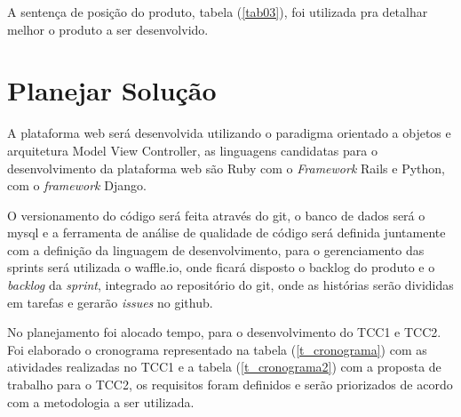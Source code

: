 A sentença de posição do produto, tabela (\ref{tab03}), foi utilizada pra detalhar melhor o produto a ser desenvolvido.

\newpage

\section {Planejar Solução}


A plataforma web será desenvolvida utilizando o paradigma orientado a objetos e arquitetura Model View Controller, as linguagens candidatas para o desenvolvimento da plataforma web são Ruby com o \textit{Framework} Rails e Python, com o \textit{framework} Django.

O versionamento do código será feita através do git, o banco de dados será o mysql e a ferramenta de análise de qualidade de código será definida juntamente com a definição da linguagem de desenvolvimento, para o gerenciamento das sprints será utilizada o waffle.io, onde ficará disposto o backlog do produto e o \textit{backlog} da \textit{sprint}, integrado ao repositório do git, onde as histórias serão divididas em tarefas e gerarão \textit{issues} no github.

No planejamento foi alocado tempo, para o desenvolvimento do TCC1 e TCC2. Foi elaborado o cronograma representado na tabela (\ref{t_cronograma}) com as atividades realizadas no TCC1 e a tabela (\ref{t_cronograma2}) com a proposta de trabalho para o TCC2, os requisitos foram definidos e serão priorizados de acordo com a metodologia a ser utilizada.

